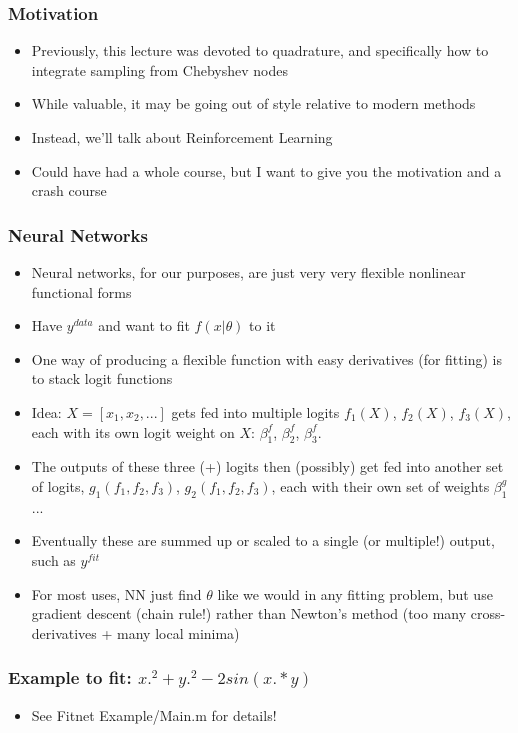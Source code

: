 \documentclass{beamer}
\author{Trevor S. Gallen}
\date{}
\begin{document}
\begin{frame}
\titlepage
\end{frame}

\begin{frame}
\frametitle[alignment=center]{Motivation}
\begin{itemize}
\item Previously, this lecture was devoted to quadrature, and specifically how to integrate sampling from Chebyshev nodes
\bigskip
\item While valuable, it may be going out of style relative to modern methods
\bigskip
\item Instead, we'll talk about Reinforcement Learning
\bigskip
\item Could have had a whole course, but I want to give you the motivation and a crash course
\end{itemize}
\end{frame}


\begin{frame}
\frametitle[alignment=center]{Neural Networks}
\begin{itemize}
\item Neural networks, for our purposes, are just very very flexible nonlinear functional forms
\smallskip
\item Have $y^{data}$ and want to fit $f(x|\theta)$ to it
\smallskip
\item One way of producing a flexible function with easy derivatives (for fitting) is to stack logit functions 
\smallskip
\item Idea:  $X=[x_1,x_2,...]$ gets fed into multiple logits $f_1(X)$, $f_2(X)$, $f_3(X)$, each with its own logit weight on $X$: $\beta_1^f$, $\beta_2^f$, $\beta_3^f$.
\smallskip
\item The outputs of these three (+) logits then (possibly) get fed into another set of logits, $g_1(f_1,f_2,f_3)$, $g_2(f_1,f_2,f_3)$, each with their own set of weights $\beta^g_1$...
\smallskip
\item Eventually these are summed up or scaled to a single (or multiple!) output, such as $y^{fit}$
\smallskip
\item For most uses, NN just find $\theta$ like we would in any fitting problem, but use gradient descent (chain rule!) rather than Newton's method (too many cross-derivatives + many local minima)
\end{itemize}
\end{frame}

\begin{frame}
\frametitle[alignment=center]{Example to fit:  $x.^2+y.^2-2sin(x.*y)$}
\begin{itemize}
\item See Fitnet Example/Main.m for details!
\end{itemize}
\end{frame}
\end{document}

